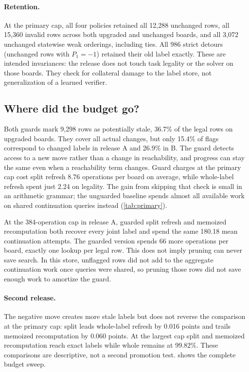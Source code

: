 \paragraph{Retention.}
At the primary cap, all four policies retained all 12,288 unchanged rows,
all 15,360 invalid rows across both upgraded and unchanged boards, and all
3,072 unchanged statewise weak orderings, including ties.
All 986 strict detours (unchanged rows with $P_1=-1$) retained their old
label exactly. These are intended invariances: the release does not touch task
legality or the solver on those boards. They check for collateral damage to
the label store, not generalization of a learned verifier.

\subsection{Where did the budget go?}
\label{sec:diagnostic}

Both guards mark 9,298 rows as potentially stale, 36.7\% of the legal
rows on upgraded boards. They cover all actual changes, but only 15.4\%
of flags correspond to changed labels in release A and 26.9\% in B.
The guard detects access to a new move rather than a change in reachability,
and progress can stay the same even when a reachability term changes.
Guard charges at the primary cap cost split refresh 8.76 operations per
board on average, while whole-label refresh spent just 2.24 on legality.
The gain from skipping that check is small in an arithmetic grammar; the
unguarded baseline spends almost all available work on shared continuation
queries instead (\cref{tab:primary}).

At the 384-operation cap in release A, guarded split refresh and memoized
recomputation both recover every joint label and spend the same 180.18
mean continuation attempts. The guarded version spends 66 more operations
per board, exactly one lookup per legal row. This does not imply pruning
can never save search. In this store, unflagged rows did not add to the
aggregate continuation work once queries were shared, so pruning those
rows did not save enough work to amortize the guard.

\paragraph{Second release.}
The negative move creates more stale labels but does not reverse the
comparison at the primary cap: split leads whole-label refresh by 0.016
points and trails memoized recomputation by 0.060 points. At the largest
cap split and memoized recomputation reach exact labels while whole
remains at 99.82\%. These comparisons are descriptive, not a second
promotion test.  shows the complete budget sweep.
